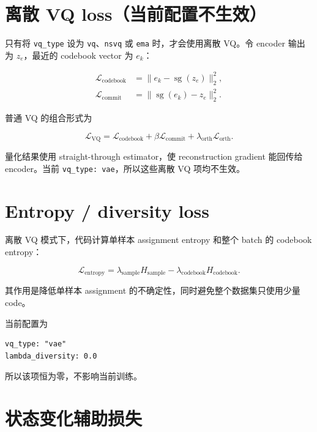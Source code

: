 \documentclass[UTF8,a4paper,11pt]{ctexart}
\begin{document}
\section{离散 VQ loss（当前配置不生效）}

只有将 \texttt{vq\_type} 设为 \texttt{vq}、\texttt{nsvq} 或 \texttt{ema} 时，才会使用离散 VQ。令 encoder 输出为 $z_e$，最近的 codebook vector 为 $e_k$：

\begin{align*}
\mathcal{L}_{\mathrm{codebook}}
&=\|e_k-\operatorname{sg}(z_e)\|_2^2,\\
\mathcal{L}_{\mathrm{commit}}
&=\|\operatorname{sg}(e_k)-z_e\|_2^2.
\end{align*}

普通 VQ 的组合形式为

\begin{equation*}
\mathcal{L}_{\mathrm{VQ}}
=\mathcal{L}_{\mathrm{codebook}}
+\beta\mathcal{L}_{\mathrm{commit}}
+\lambda_{\mathrm{orth}}\mathcal{L}_{\mathrm{orth}}.
\end{equation*}

量化结果使用 straight-through estimator，使 reconstruction gradient 能回传给 encoder。当前 \texttt{vq\_type: vae}，所以这些离散 VQ 项均不生效。

\section{Entropy / diversity loss}

离散 VQ 模式下，代码计算单样本 assignment entropy 和整个 batch 的 codebook entropy：

\begin{equation*}
\mathcal{L}_{\mathrm{entropy}}
=\lambda_{\mathrm{sample}}H_{\mathrm{sample}}
-\lambda_{\mathrm{codebook}}H_{\mathrm{codebook}}.
\end{equation*}

其作用是降低单样本 assignment 的不确定性，同时避免整个数据集只使用少量 code。

当前配置为

\begin{verbatim}
vq_type: "vae"
lambda_diversity: 0.0
\end{verbatim}

所以该项恒为零，不影响当前训练。

\section{状态变化辅助损失}
\end{document}
